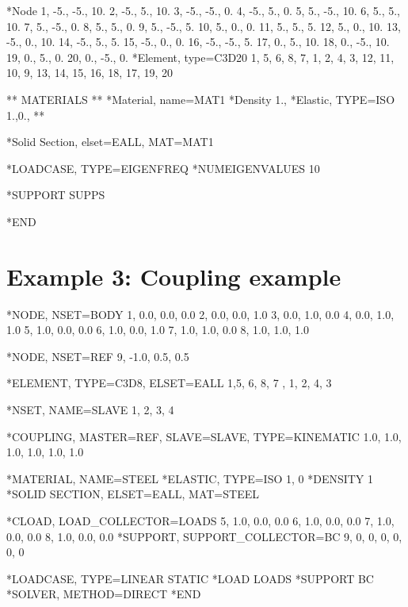 \begin{codeBlock}
*Node
      1,          -5.,          -5.,          10.
      2,          -5.,           5.,          10.
      3,          -5.,          -5.,           0.
      4,          -5.,           5.,           0.
      5,           5.,          -5.,          10.
      6,           5.,           5.,          10.
      7,           5.,          -5.,           0.
      8,           5.,           5.,           0.
      9,           5.,          -5.,           5.
     10,           5.,           0.,           0.
     11,           5.,           5.,           5.
     12,           5.,           0.,          10.
     13,          -5.,           0.,          10.
     14,          -5.,           5.,           5.
     15,          -5.,           0.,           0.
     16,          -5.,          -5.,           5.
     17,           0.,           5.,          10.
     18,           0.,          -5.,          10.
     19,           0.,           5.,           0.
     20,           0.,          -5.,           0.
*Element, type=C3D20
1,  5,  6,  8,  7,  1,  2,  4,  3, 12, 11, 10,
9, 13, 14, 15, 16, 18, 17, 19, 20

** MATERIALS
**
*Material, name=MAT1
*Density
1.,
*Elastic, TYPE=ISO
1.,0.,
**

*Solid Section, elset=EALL, MAT=MAT1

*LOADCASE, TYPE=EIGENFREQ
*NUMEIGENVALUES
10

*SUPPORT
SUPPS

*END
\end{codeBlock}
\newpage





\section{Example 3: Coupling example}

\begin{codeBlock}
*NODE, NSET=BODY
1, 0.0, 0.0, 0.0
2, 0.0, 0.0, 1.0
3, 0.0, 1.0, 0.0
4, 0.0, 1.0, 1.0
5, 1.0, 0.0, 0.0
6, 1.0, 0.0, 1.0
7, 1.0, 1.0, 0.0
8, 1.0, 1.0, 1.0

*NODE, NSET=REF
9, -1.0, 0.5, 0.5

*ELEMENT, TYPE=C3D8, ELSET=EALL
1,5, 6, 8, 7 , 1, 2, 4, 3

*NSET, NAME=SLAVE
1, 2, 3, 4

*COUPLING, MASTER=REF, SLAVE=SLAVE, TYPE=KINEMATIC
1.0, 1.0, 1.0, 1.0, 1.0, 1.0

*MATERIAL, NAME=STEEL
*ELASTIC, TYPE=ISO
1, 0
*DENSITY
1
*SOLID SECTION, ELSET=EALL, MAT=STEEL

*CLOAD, LOAD_COLLECTOR=LOADS
5, 1.0, 0.0, 0.0
6, 1.0, 0.0, 0.0
7, 1.0, 0.0, 0.0
8, 1.0, 0.0, 0.0
*SUPPORT, SUPPORT_COLLECTOR=BC
9, 0, 0, 0, 0, 0, 0

*LOADCASE, TYPE=LINEAR STATIC
*LOAD
LOADS
*SUPPORT
BC
*SOLVER, METHOD=DIRECT
*END
\end{codeBlock}
\newpage




